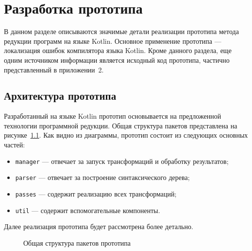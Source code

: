 \chapter{Разработка прототипа}
В данном разделе описываются значимые детали реализации прототипа метода редукции программ на языке Kotlin. Основное применение прототипа --- локализация ошибок компилятора языка Kotlin. Кроме данного раздела, еще одним источником информации является исходный код прототипа, частично представленный в приложении~2.

\section{Архитектура прототипа}
Разработанный на языке Kotlin прототип основывается на предложенной технологии программной редукции. Общая структура пакетов представлена на рисунке~\ref{packages}. Как видно из диаграммы, прототип состоит из следующих основных частей:
%
\begin{itemize}
	\item \texttt{manager} --- отвечает за запуск трансформаций и обработку результатов;
	\item \texttt{parser} --- отвечает за построение синтаксического дерева;
	\item \texttt{passes} --- содержит реализацию всех трансформаций;
	\item \texttt{util} --- содержит вспомогательные компоненты.
\end{itemize}
%
Далее реализация прототипа будет рассмотрена более детально.

\begin{figure}
\caption{\label{packages}Общая структура пакетов прототипа}
\end{figure}

